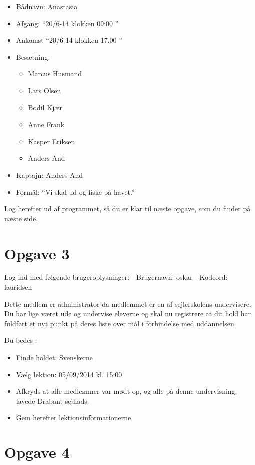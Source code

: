 \begin{itemize}
	\item Bådnavn: Anastasia
	\item Afgang: ``20/6-14 klokken 09:00 ''
	\item Ankomst ``20/6-14 klokken 17.00 ''
	\item Besætning: 
	\begin{itemize}
		\item Marcus Husmand
		\item Lars Olsen
		\item Bodil Kjær
		\item Anne Frank
		\item Kasper Eriksen
		\item Anders And
	\end{itemize}
	\item Kaptajn: Anders And
	\item Formål: ``Vi skal ud og fiske på havet.''

\end{itemize}

Log herefter ud af programmet, så du er klar til næste opgave, som du finder på næste side.
 
\section{Opgave 3}

Log ind med følgende brugeroplysninger: 
\newline - Brugernavn: oskar
\newline - Kodeord: lauridsen

Dette medlem er administrator da medlemmet er en af sejlerskolens undervisere.
Du har lige været ude og undervise eleverne og skal nu registrere at dit hold har fuldført et nyt punkt på deres liste over mål i forbindelse med uddannelsen.

Du bedes :

\begin{itemize}
\item Finde holdet: Svenskerne
\item Vælg lektion: 05/09/2014 kl. 15:00 
\item Afkryds at alle medlemmer var mødt op, og alle på denne undervisning, lavede Drabant sejllads.
\item Gem herefter lektionsinformationerne
\end{itemize}


\section{Opgave 4}

